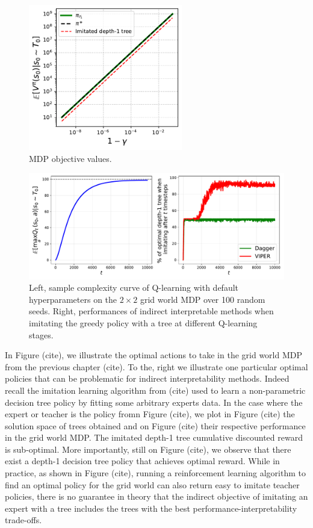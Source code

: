 \begin{figure}
    \centering
    \includegraphics[width=0.6\textwidth]{images/images_part1/policy_values_comparison.pdf}
    \caption{MDP objective values.}\label{fig:objectives}
\end{figure}

\begin{figure}
    \centering
    \includegraphics[width=1\textwidth]{images/images_part1/base_mdp.pdf}
    \caption{Left, sample complexity curve of Q-learning with default hyperparameters on the $2\times 2$ grid world MDP over 100 random seeds. Right, performances of indirect interpretable methods when imitating the greedy policy with a tree at different Q-learning stages. }
\end{figure}
In Figure (cite), we illustrate the optimal actions to take in the grid world MDP from the previous chapter (cite). To the, right we illustrate one particular optimal policies that can be problematic for indirect interpretability methods.
Indeed recall the imitation learning algorithm from (cite) used to learn a non-parametric decision tree policy by fitting some arbitrary experts data. 
In the case where the expert or teacher is the policy fromn Figure (cite), we plot in Figure (cite) the solution space of trees obtained and on Figure (cite) their respective performance in the grid world MDP.
The imitated depth-1 tree cumulative discounted reward is sub-optimal.
More importantly, still on Figure (cite), we observe that there exist a depth-1 decision tree policy that achieves optimal reward.
While in practice, as shown in Figure (cite), running a reinforcement learning algorithm to find an optimal policy for the grid world can also return easy to imitate teacher policies, there is no guarantee in theory that the indirect objective of imitating an expert with a tree includes the trees with the best performance-interpretability trade-offs.

